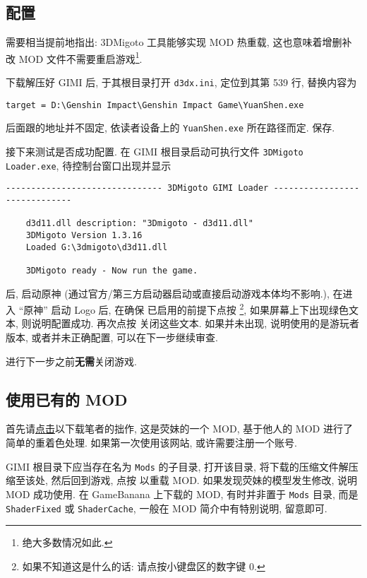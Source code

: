         \subsection{配置}
            \par 需要相当提前地指出: 3DMigoto 工具能够实现 MOD 热重载, 这也意味着增删补改 MOD 文件不需要重启游戏\footnote{绝大多数情况如此.}.
            \par 下载解压好 GIMI 后, 于其根目录打开 \texttt{d3dx.ini}, 定位到其第 539 行, 替换内容为
            \begin{lstlisting}[basicstyle=\ttfamily]
        target = D:\Genshin Impact\Genshin Impact Game\YuanShen.exe
            \end{lstlisting}
            后面跟的地址并不固定, 依读者设备上的 \texttt{YuanShen.exe} 所在路径而定. 保存.
            \par 接下来测试是否成功配置. 在 GIMI 根目录启动可执行文件 \texttt{3DMigoto Loader.exe}, 待控制台窗口出现并显示
            \begin{lstlisting}[basicstyle=\ttfamily]
    ------------------------------- 3DMigoto GIMI Loader ------------------------------

    d3d11.dll description: "3Dmigoto - d3d11.dll"
    3DMigoto Version 1.3.16
    Loaded G:\3dmigoto\d3d11.dll

    3DMigoto ready - Now run the game.            
            \end{lstlisting}
            后, 启动原神 (通过官方/第三方启动器启动或直接启动游戏本体均不影响.), 在进入 ``原神'' 启动 Logo 后, 在确保  已启用的前提下点按 \footnote{如果不知道这是什么的话: 请点按小键盘区的数字键 0.}, 如果屏幕上下出现绿色文本, 则说明配置成功. 再次点按  关闭这些文本. 如果并未出现, 说明使用的是游玩者版本, 或者并未正确配置, 可以在下一步继续审查.
            \par 进行下一步之前\textbf{无需}关闭游戏.

        \subsection{使用已有的 MOD}
            \par 首先请\href{https://filecache33.gamebanana.com/mods/lumine_lantern_rite.zip}{点击}以下载笔者的拙作, 这是荧妹的一个 MOD, 基于他人的 MOD 进行了简单的重着色处理. 如果第一次使用该网站, 或许需要注册一个账号.
            \par GIMI 根目录下应当存在名为 \texttt{Mods} 的子目录, 打开该目录, 将下载的压缩文件解压缩至该处, 然后回到游戏, 点按  以重载 MOD. 如果发现荧妹的模型发生修改, 说明 MOD 成功使用. 在 GameBanana 上下载的 MOD, 有时并非置于 \texttt{Mods} 目录, 而是 \texttt{ShaderFixed} 或 \texttt{ShaderCache}, 一般在 MOD 简介中有特别说明, 留意即可.

